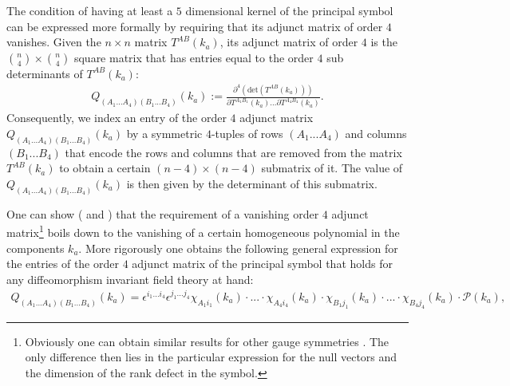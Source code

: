 The condition of having at least a $5$ dimensional kernel of the principal symbol can be expressed more formally by requiring that its adjunct matrix of order $4$ vanishes. Given the $n \times n$ matrix $T^{AB}(k_a)$, its adjunct matrix of order $4$ is the $\binom{n}{4} \times \binom{n}{4}$ square matrix that has entries equal to the order $4$ sub determinants of $T^{AB}(k_a)$:
\begin{align}\label{MinorDef}
    Q_{(A_1...A_4) (B_1...B_4)}(k_a) := \frac{\partial^4 (\mathrm{det}(T^{AB}(k_a)))}{\partial T^{A_1 B_1}(k_a) ... \partial T^{A_4 B_4}(k_a)}.
\end{align}
Consequently, we index an entry of the order $4$ adjunct matrix $Q_{(A_1...A_4) (B_1...B_4)}(k_a)$ by a symmetric $4$-tuples of rows $(A_1...A_4)$ and columns $(B_1...B_4)$ that encode the rows and columns that are removed from the matrix $T^{AB}(k_a)$ to obtain a certain $(n-4) \times (n-4)$ submatrix of it. The value of $Q_{(A_1...A_4) (B_1...B_4)}(k_a)$ is then given by the determinant of this submatrix. 

One can show (\cite{2018PhRvD..97h4036D} and \cite{2009JPhA...42U5402I}) that the requirement of a vanishing order $4$ adjunct matrix\footnote{Obviously one can obtain similar results for other gauge symmetries \cite{2018PhRvD..97h4036D}. The only difference then lies in the particular expression for the null vectors and the dimension of the rank defect in the symbol.} boils down to the vanishing of a certain homogeneous polynomial in the components $k_a$. More rigorously one obtains the following general expression for the entries of the order $4$ adjunct matrix of the principal symbol that holds for any diffeomorphism invariant field theory at hand:
\begin{align}\label{diffeoMinor}
    Q_{(A_1...A_4) (B_1...B_4)}(k_a) = \epsilon^{i_1...i_4} \epsilon^{j_1...j_4} \chi_{A_1i_1}(k_a) \cdot ... \cdot \chi_{A_4i_4}(k_a) \cdot \chi_{B_1j_1}(k_a) \cdot ... \cdot \chi_{B_4j_4}(k_a) \cdot \mathcal{P}(k_a),
\end{align}

